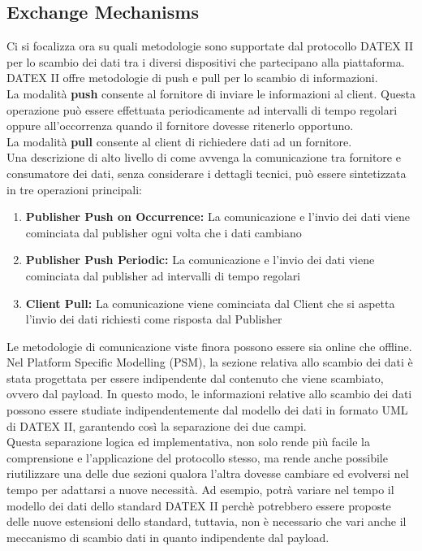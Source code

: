 \subsection{Exchange Mechanisms}
Ci si focalizza ora su quali metodologie sono supportate dal protocollo DATEX II per lo scambio dei dati tra i diversi dispositivi che partecipano alla piattaforma. \\
DATEX II offre metodologie di push e pull per lo scambio di informazioni. \\
La modalità \textbf{push} consente al fornitore di inviare le informazioni al client. Questa operazione può essere effettuata periodicamente ad intervalli di tempo regolari oppure all'occorrenza quando il fornitore dovesse ritenerlo opportuno.\\
La modalità \textbf{pull} consente al client di richiedere dati ad un fornitore.\\
Una descrizione di alto livello di come avvenga la comunicazione tra fornitore e consumatore dei dati, senza considerare i dettagli tecnici, può essere sintetizzata in tre operazioni principali:
\begin{enumerate}
	\item \textbf{Publisher Push on Occurrence: } La comunicazione e l'invio dei dati viene cominciata dal publisher ogni volta che i dati cambiano
	\item \textbf{Publisher Push Periodic: } La comunicazione e l'invio dei dati viene cominciata dal publisher ad intervalli di tempo regolari
	\item \textbf{Client Pull: } La comunicazione viene cominciata dal Client che si aspetta l'invio dei dati richiesti come risposta dal Publisher
\end{enumerate}
Le metodologie di comunicazione viste finora possono essere sia online che offline. Nel Platform Specific Modelling (PSM), la sezione relativa allo scambio dei dati è stata progettata per essere indipendente dal contenuto che viene scambiato, ovvero dal payload. In questo modo, le informazioni relative allo scambio dei dati possono essere studiate indipendentemente dal modello dei dati in formato UML di DATEX II, garantendo così la separazione dei due campi.\\
Questa separazione logica ed implementativa, non solo rende più facile la comprensione e l'applicazione del protocollo stesso, ma rende anche possibile riutilizzare una delle due sezioni qualora l'altra dovesse cambiare ed evolversi nel tempo per adattarsi a nuove necessità. Ad esempio, potrà variare nel tempo il modello dei dati dello standard DATEX II perchè potrebbero essere proposte delle nuove estensioni dello standard, tuttavia, non è necessario che vari anche il meccanismo di scambio dati in quanto indipendente dal payload.

